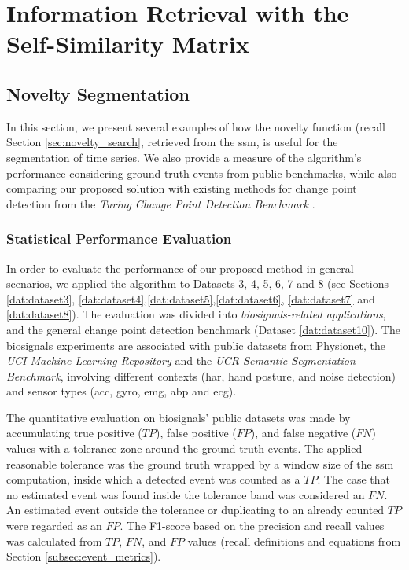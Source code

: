 \section{Information Retrieval with the Self-Similarity Matrix}

\subsection{Novelty Segmentation}

In this section, we present several examples of how the novelty function (recall Section \ref{sec:novelty_search}, retrieved from the \gls{ssm}, is useful for the segmentation of time series. We also provide a measure of the algorithm's performance considering ground truth events from public benchmarks, while also comparing our proposed solution with existing methods for change point detection from the \textit{Turing Change Point Detection Benchmark} \cite{cpd_alan}.

\subsubsection{Statistical Performance Evaluation}

In order to evaluate the performance of our proposed method in general scenarios, we applied the algorithm to Datasets 3, 4, 5, 6, 7 and 8 (see Sections \ref{dat:dataset3}, \ref{dat:dataset4},\ref{dat:dataset5},\ref{dat:dataset6}, \ref{dat:dataset7} and \ref{dat:dataset8}). The evaluation was divided into \textit{biosignals-related applications}, and the general change point detection benchmark (Dataset \ref{dat:dataset10}). The biosignals experiments are associated with public datasets from Physionet, the \textit{UCI Machine Learning Repository} and the \textit{UCR Semantic Segmentation Benchmark}, involving different contexts (\gls{har}, hand posture, and noise detection) and sensor types (\gls{acc}, \gls{gyro}, \gls{emg}, \gls{abp} and \gls{ecg}).

The quantitative evaluation on biosignals' public datasets was made by accumulating true positive ($TP$), false positive ($FP$), and false negative ($FN$) values with a tolerance zone around the ground truth events. The applied reasonable tolerance was the ground truth wrapped by a window size of the \gls{ssm} computation, inside which a detected event was counted as a $TP$. The case that no estimated event was found inside the tolerance band was considered an $FN$. An estimated event outside the tolerance or duplicating to an already counted $TP$ were regarded as an $FP$. The F1-score based on the precision and recall values was calculated from $TP$, $FN$, and $FP$ values (recall definitions and equations from Section \ref{subsec:event_metrics}).


